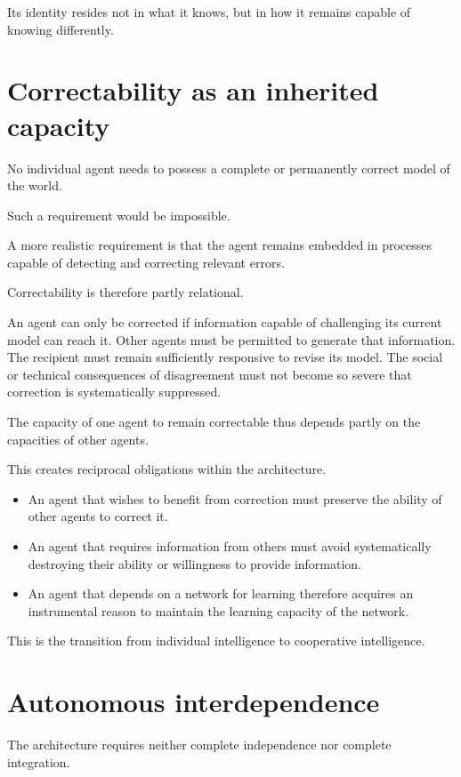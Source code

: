 \documentclass[11pt, a4paper]{article}
\begin{document}
Its identity resides not in what it knows, but in how it remains capable of knowing differently.

\section{Correctability as an inherited capacity}
No individual agent needs to possess a complete or permanently correct model of the world.

Such a requirement would be impossible.

A more realistic requirement is that the agent remains embedded in processes capable of detecting and correcting relevant errors.

Correctability is therefore partly relational.

An agent can only be corrected if information capable of challenging its current model can reach it. Other agents must be permitted to generate that information. The recipient must remain sufficiently responsive to revise its model. The social or technical consequences of disagreement must not become so severe that correction is systematically suppressed.

The capacity of one agent to remain correctable thus depends partly on the capacities of other agents.

This creates reciprocal obligations within the architecture.

\begin{itemize}[leftmargin=*]
    \item An agent that wishes to benefit from correction must preserve the ability of other agents to correct it.
    \item An agent that requires information from others must avoid systematically destroying their ability or willingness to provide information.
    \item An agent that depends on a network for learning therefore acquires an instrumental reason to maintain the learning capacity of the network.
\end{itemize}

This is the transition from individual intelligence to cooperative intelligence.

\section{Autonomous interdependence}
The architecture requires neither complete independence nor complete integration.
\end{document}
